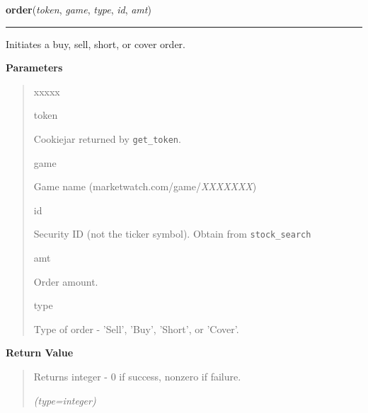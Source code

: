 \hspace{.8\funcindent}\begin{boxedminipage}{\funcwidth}

    \raggedright \textbf{order}(\textit{token}, \textit{game}, \textit{type}, \textit{id}, \textit{amt})

    \vspace{-1.5ex}

    \rule{\textwidth}{0.5\fboxrule}
\setlength{\parskip}{2ex}
    Initiates a buy, sell, short, or cover order.

\setlength{\parskip}{1ex}
      \textbf{Parameters}
      \vspace{-1ex}

      \begin{quote}
        \begin{Ventry}{xxxxx}

          \item[token]

          Cookiejar returned by \texttt{get\_token}.

          \item[game]

          Game name (marketwatch.com/game/\textit{XXXXXXX})

          \item[id]

          Security ID (not the ticker symbol). Obtain from 
          \texttt{stock\_search}

          \item[amt]

          Order amount.

          \item[type]

          Type of order - 'Sell', 'Buy', 'Short', or 'Cover'.

        \end{Ventry}

      \end{quote}

      \textbf{Return Value}
    \vspace{-1ex}

      \begin{quote}
      Returns integer - 0 if success, nonzero if failure.

      {\it (type=integer)}

      \end{quote}

    \end{boxedminipage}

